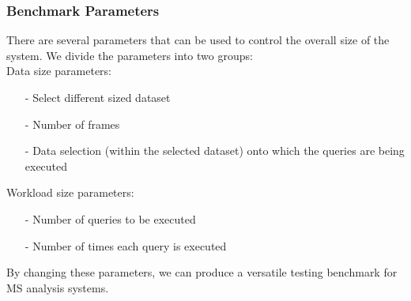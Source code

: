 \documentclass[10pt,journal,final,letterpaper,twocolumn]{IEEEtran}
\begin{document}
\subsubsection{Benchmark Parameters} There are several parameters
that can be used to control the overall size of the system. We divide the parameters into two groups:\\
Data size parameters:
\begin{itemize}
\item[-]Select different sized dataset
\item[-]Number of frames
\item[-]Data selection (within the selected dataset) onto which the queries are being executed
\end{itemize}
Workload size parameters:
\begin{itemize}
\item[-]Number of queries to be executed
\item[-]Number of times each query is executed
\end{itemize}
By changing these parameters, we can produce a versatile testing
benchmark for MS analysis systems.
\end{document}
